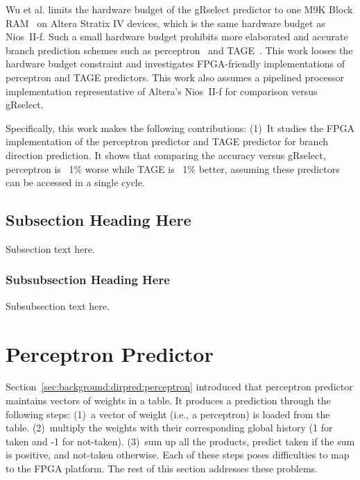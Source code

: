 \documentclass[conference]{IEEEtran}
\begin{document}
Wu et al. limits the hardware budget of the gRselect predictor to one M9K Block RAM~\cite{StratixIVM9K} on Altera Stratix IV devices, which is the same hardware budget as Nios~II-f. Such a small hardware budget prohibits more elaborated and accurate branch prediction schemes such as perceptron~\cite{perceptron} and TAGE~\cite{tage}. This work looses the hardware budget constraint and investigates FPGA-friendly implementations of perceptron and TAGE predictors. This work also assumes a pipelined processor implementation representative of Altera's Nios~II-f for comparison versus gRselect.

Specifically, this work makes the following contributions: (1)~It studies the FPGA implementation of the perceptron predictor and TAGE predictor for branch direction prediction. It shows that comparing the accuracy versus gRselect, perceptron is ~1\% worse while TAGE is ~1\% better, assuming these predictors can be accessed in a single cycle.







\subsection{Subsection Heading Here}
Subsection text here.


\subsubsection{Subsubsection Heading Here}
Subsubsection text here.





\section{Perceptron Predictor}
\label{sec:advanced:perceptron}
Section~\ref{sec:background:dirpred:perceptron} introduced that perceptron predictor maintains vectors of weights in a table. It produces a prediction through the following steps: (1)~a vector of weight (i.e., a perceptron) is loaded from the table. (2)~multiply the weights with their corresponding global history (1 for taken and -1 for not-taken). (3)~sum up all the products, predict taken if the sum is positive, and not-taken otherwise. Each of these steps poses difficulties to map to the FPGA platform. The rest of this section addresses these problems.
\end{document}
